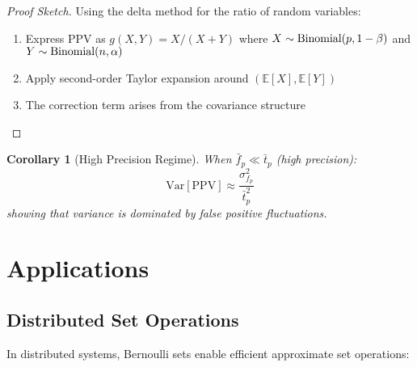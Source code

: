 \documentclass[11pt,final,hidelinks]{article}
\newtheorem{corollary}[theorem]{Corollary}
\begin{document}
\begin{proof}[Proof Sketch]
Using the delta method for the ratio of random variables:
\begin{enumerate}
    \item Express PPV as $g(X,Y) = X/(X+Y)$ where $X \sim \text{Binomial}(p, 1-\beta)$ and $Y \sim \text{Binomial}(n, \alpha)$
    \item Apply second-order Taylor expansion around $(\mathbb{E}[X], \mathbb{E}[Y])$
    \item The correction term arises from the covariance structure
\end{enumerate}
\end{proof}

\begin{corollary}[High Precision Regime]
When $\bar{f}_p \ll \bar{t}_p$ (high precision):
\begin{equation}
\text{Var}[\text{PPV}] \approx \frac{\sigma_{f_p}^2}{\bar{t}_p^2}
\end{equation}
showing that variance is dominated by false positive fluctuations.
\end{corollary}

\section{Applications}

\subsection{Distributed Set Operations}

In distributed systems, Bernoulli sets enable efficient approximate set operations:
\end{document}

